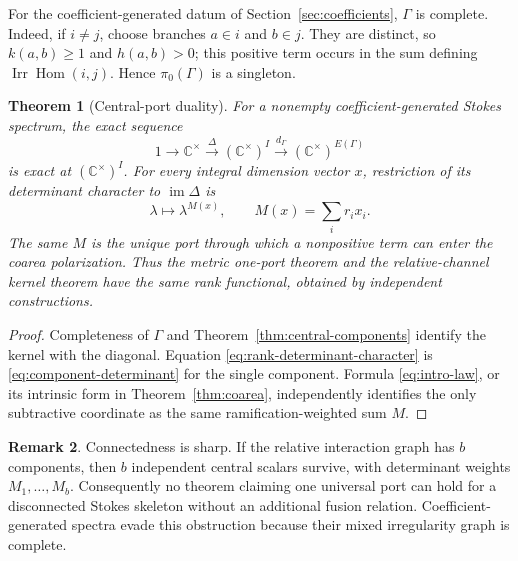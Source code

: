 \documentclass[11pt,a4paper]{amsart}
\theoremstyle{plain}
\newtheorem{theorem}{Theorem}[section]
\theoremstyle{definition}
\newtheorem{remark}[theorem]{Remark}
\newcommand{\CC}{\mathbb C}
\newcommand{\Irr}{\operatorname{Irr}}
\newcommand{\Hom}{\operatorname{Hom}}
\newcommand{\im}{\operatorname{im}}
\begin{document}
For the coefficient-generated datum of Section~\ref{sec:coefficients}, $\Gamma$ is complete.
Indeed, if $i\ne j$, choose branches $a\in i$ and $b\in j$.  They are distinct, so
$k(a,b)\geq1$ and $h(a,b)>0$; this positive term occurs in the sum defining
$\Irr\Hom(i,j)$.  Hence $\pi_0(\Gamma)$ is a singleton.

\begin{theorem}[Central-port duality]\label{thm:central-port}
For a nonempty coefficient-generated Stokes spectrum, the exact sequence
\begin{equation}\label{eq:central-exact}
 1\longrightarrow\CC^\times\xrightarrow{\Delta}(\CC^\times)^I
   \xrightarrow{d_\Gamma}(\CC^\times)^{E(\Gamma)}
\end{equation}
is exact at $(\CC^\times)^I$.  For every integral dimension vector $x$, restriction of its
determinant character to $\im\Delta$ is
\begin{equation}\label{eq:rank-determinant-character}
              \lambda\longmapsto\lambda^{M(x)},\qquad
              M(x)=\sum_i r_ix_i.
\end{equation}
The same $M$ is the unique port through which a nonpositive term can enter the coarea
polarization.  Thus the metric one-port theorem and the relative-channel kernel theorem have the
same rank functional, obtained by independent constructions.
\end{theorem}

\begin{proof}
Completeness of $\Gamma$ and Theorem~\ref{thm:central-components} identify the kernel with the
diagonal.  Equation \eqref{eq:rank-determinant-character} is
\eqref{eq:component-determinant} for the single component.  Formula
\eqref{eq:intro-law}, or its intrinsic form in Theorem~\ref{thm:coarea}, independently
identifies the only subtractive coordinate as the same ramification-weighted sum $M$.
\end{proof}

\begin{remark}\label{rem:disconnected-ports}
Connectedness is sharp.  If the relative interaction graph has $b$ components, then $b$ independent
central scalars survive, with determinant weights $M_1,\ldots,M_b$.  Consequently no theorem
claiming one universal port can hold for a disconnected Stokes skeleton without an additional
fusion relation.  Coefficient-generated spectra evade this obstruction because their mixed
irregularity graph is complete.
\end{remark}
\end{document}
